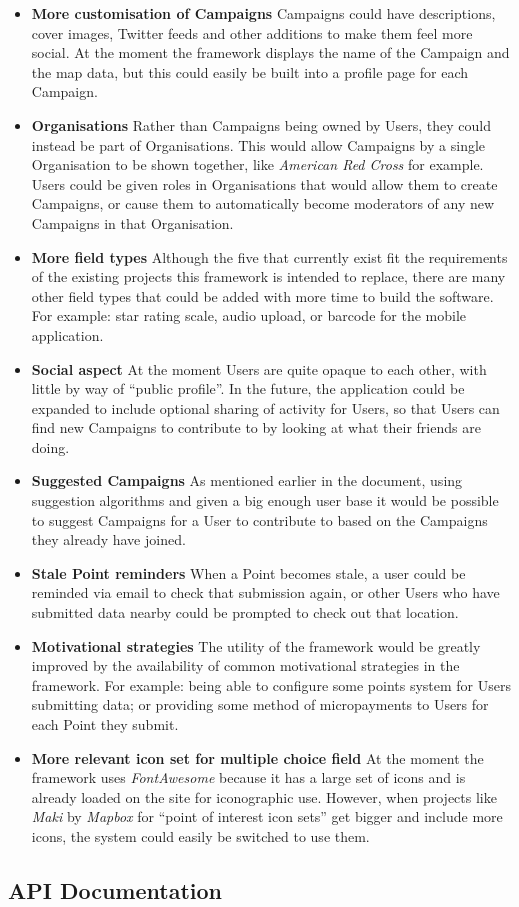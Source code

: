\documentclass{article}
\let\oldsection\section
\renewcommand\section{\clearpage\oldsection}
\newcommand{\pitem}[1]{
	\item{\textbf{#1}}
}
\begin{document}
		\begin{itemize}
			\pitem{More customisation of Campaigns} Campaigns could have descriptions, cover images, Twitter feeds and other additions to make them feel more social. At the moment the framework displays the name of the Campaign and the map data, but this could easily be built into a profile page for each Campaign.
			\pitem{Organisations} Rather than Campaigns being owned by Users, they could instead be part of Organisations. This would allow Campaigns by a single Organisation to be shown together, like \emph{American Red Cross} for example. Users could be given roles in Organisations that would allow them to create Campaigns, or cause them to automatically become moderators of any new Campaigns in that Organisation.
			\pitem{More field types} Although the five that currently exist fit the requirements of the existing projects this framework is intended to replace, there are many other field types that could be added with more time to build the software. For example: star rating scale, audio upload, or barcode for the mobile application.
			\pitem{Social aspect} At the moment Users are quite opaque to each other, with little by way of ``public profile''. In the future, the application could be expanded to include optional sharing of activity for Users, so that Users can find new Campaigns to contribute to by looking at what their friends are doing.
			\pitem{Suggested Campaigns} As mentioned earlier in the document, using suggestion algorithms and given a big enough user base it would be possible to suggest Campaigns for a User to contribute to based on the Campaigns they already have joined.
			\pitem{Stale Point reminders} When a Point becomes stale, a user could be reminded via email to check that submission again, or other Users who have submitted data nearby could be prompted to check out that location.
			\pitem{Motivational strategies} The utility of the framework would be greatly improved by the availability of common motivational strategies in the framework. For example: being able to configure some points system for Users submitting data; or providing some method of micropayments to Users for each Point they submit.
			\pitem{More relevant icon set for multiple choice field} At the moment the framework uses \emph{FontAwesome} because it has a large set of icons and is already loaded on the site for iconographic use. However, when projects like \emph{Maki} by \emph{Mapbox} for ``point of interest icon sets'' get bigger and include more icons, the system could easily be switched to use them.
		\end{itemize}

	
	

	\clearpage
	\begin{appendices}
	\oldsection{API Documentation}
	\label{sec:api-docs}
	\end{appendices}
\end{document}
